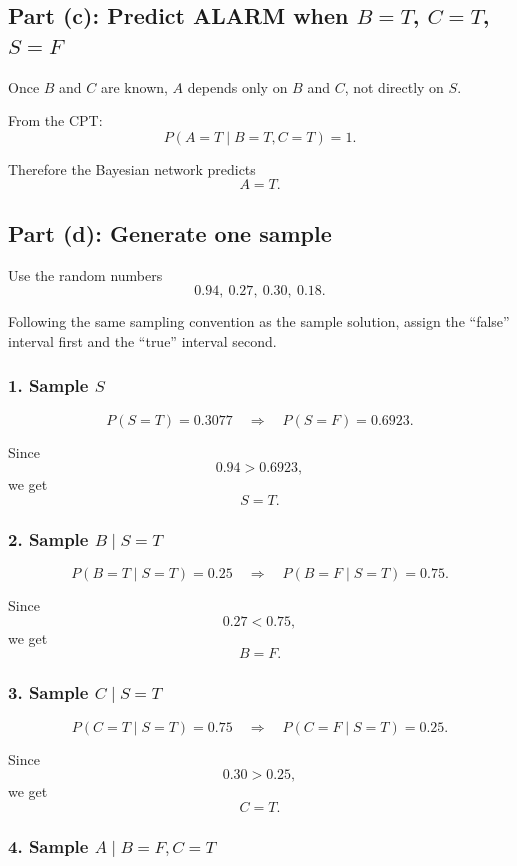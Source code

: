 \documentclass[11pt]{article}
\begin{document}
\subsection*{Part (c): Predict ALARM when \(B=T\), \(C=T\), \(S=F\)}

Once \(B\) and \(C\) are known, \(A\) depends only on \(B\) and \(C\), not directly
on \(S\).

From the CPT:
\[
    P(A=T\mid B=T,C=T)=1.
\]

Therefore the Bayesian network predicts
\[
    \boxed{A=T.}
\]

\subsection*{Part (d): Generate one sample}

Use the random numbers
\[
    0.94,\ 0.27,\ 0.30,\ 0.18.
\]

Following the same sampling convention as the sample solution, assign the
``false'' interval first and the ``true'' interval second.

\subsubsection*{1. Sample \(S\)}

\[
    P(S=T)=0.3077
    \quad\Rightarrow\quad
    P(S=F)=0.6923.
\]

Since
\[
    0.94 > 0.6923,
\]
we get
\[
    S=T.
\]

\subsubsection*{2. Sample \(B\mid S=T\)}

\[
    P(B=T\mid S=T)=0.25
    \quad\Rightarrow\quad
    P(B=F\mid S=T)=0.75.
\]

Since
\[
    0.27 < 0.75,
\]
we get
\[
    B=F.
\]

\subsubsection*{3. Sample \(C\mid S=T\)}

\[
    P(C=T\mid S=T)=0.75
    \quad\Rightarrow\quad
    P(C=F\mid S=T)=0.25.
\]

Since
\[
    0.30 > 0.25,
\]
we get
\[
    C=T.
\]

\subsubsection*{4. Sample \(A\mid B=F,C=T\)}
\end{document}
